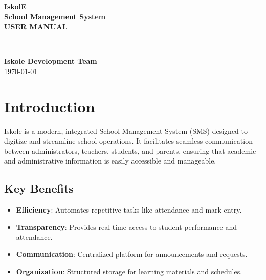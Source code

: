 \documentclass[12pt, a4paper]{report}
\begin{document}
\begin{titlepage}
    \centering
    \vspace*{0.2cm}

    {\Huge\textbf{\color{themedarkblue}IskolE}}\\[0.3cm]
    {\LARGE\textbf{\color{themeblue}School Management System}}\\[0.8cm]

    {\Large\textbf{\color{themedarkblue}USER MANUAL}}\\[0.5cm]

    {\color{themeblue}\rule{0.8\textwidth}{0.4pt}}\\[0.6cm]

    {\large\textbf{\color{themedarkblue}Iskole Development Team}}\\[0.2cm]
    {\large \today}

    \vfill
\end{titlepage}

\tableofcontents
\newpage

\chapter{Introduction}
Iskole is a modern, integrated School Management System (SMS) designed to digitize and streamline school operations. It facilitates seamless communication between administrators, teachers, students, and parents, ensuring that academic and administrative information is easily accessible and manageable.

\section{Key Benefits}
\begin{itemize}
    \item \textbf{Efficiency}: Automates repetitive tasks like attendance and mark entry.
    \item \textbf{Transparency}: Provides real-time access to student performance and attendance.
    \item \textbf{Communication}: Centralized platform for announcements and requests.
    \item \textbf{Organization}: Structured storage for learning materials and schedules.
\end{itemize}
\end{document}
